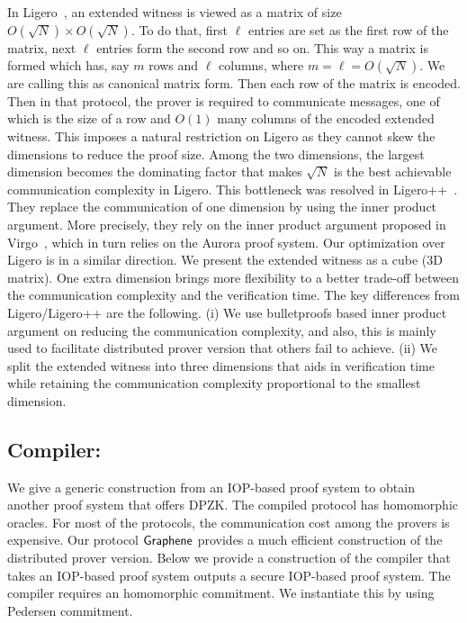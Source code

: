 In Ligero~\cite{ligero}, an extended witness is viewed as a matrix of size $O(\sqrt{N}) \times O(\sqrt{N})$. To do that, first $\ell$ entries are set as the first row of the matrix, next $\ell$ entries form the second row and so on. This way a matrix is formed which has, say $m$ rows and $\ell$ columns, where $m = \ell = O(\sqrt{N})$. We are calling this as canonical matrix form. 
Then each row of the matrix is encoded. Then in that protocol, the prover is required to communicate messages, one of which is the size of a row and $O(1)$ many columns of the encoded extended witness. This imposes a natural restriction on Ligero as they cannot skew the dimensions to reduce the proof size. Among the two dimensions, the largest dimension becomes the dominating factor that makes $\sqrt{N}$ is the best achievable communication complexity in Ligero. This bottleneck was resolved in Ligero++~\cite{ligero++}. They replace the communication of one dimension by using the inner product argument. More precisely, they rely on the inner product argument proposed in Virgo~\cite{Virgo}, which in turn relies on the Aurora proof system. Our optimization over Ligero is in a similar direction. We present the extended witness as a cube (3D matrix). One extra dimension brings more flexibility to a better trade-off between the communication complexity and the verification time. The key differences from Ligero/Ligero++ are the following.
(i) We use bulletproofs based inner product argument on reducing the communication complexity, and also, this is mainly used to facilitate distributed prover version that others fail to achieve.
(ii) We split the extended witness into three dimensions that aids in verification time while retaining the communication complexity proportional to the smallest dimension.
\subsection{Compiler:}\label{sec:compiler_construction}
We give a generic construction from an IOP-based proof system to obtain another proof system that offers DPZK. The compiled protocol has homomorphic oracles. For most of the protocols, the communication cost among the provers is expensive. Our protocol $\textsf{Graphene}$ provides a much efficient construction of the distributed prover version.
Below we provide a construction of the compiler that takes an IOP-based proof system outputs a secure IOP-based proof system. The compiler requires an homomorphic commitment. We instantiate this by using Pedersen commitment.

